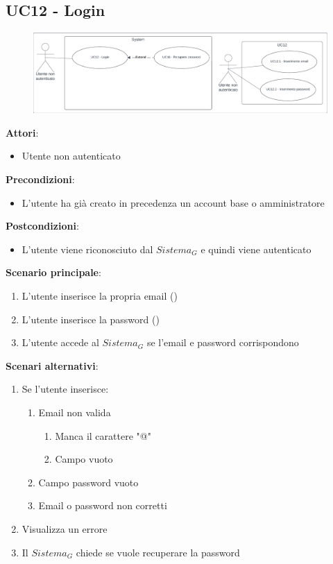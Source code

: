 \subsection{UC12 - Login} \label{usecase:12}
\begin{figure}[H]
    \centering
    \includegraphics[width=0.9\linewidth]{ucd/ucd12.png}
\end{figure}
\textbf{Attori}:
\begin{itemize}
    \item Utente non autenticato
\end{itemize}
\textbf{Precondizioni}:
\begin{itemize}
    \item L'utente ha già creato in precedenza un account base o amministratore
\end{itemize}
\textbf{Postcondizioni}:
\begin{itemize}
    \item L'utente viene riconosciuto dal $\textit{Sistema}_G$ e quindi viene autenticato
\end{itemize}
\textbf{Scenario principale}:
\begin{enumerate}
    \item L'utente inserisce la propria email ()
    \item L'utente inserisce la password ()
    \item L'utente accede al $\textit{Sistema}_G$ se l'email e password corrispondono
\end{enumerate}
\textbf{Scenari alternativi}:
\begin{enumerate}
    \item Se l'utente inserisce:
    \begin{enumerate}
        \item Email non valida
        \begin{enumerate}
            \item Manca il carattere "@"
            \item Campo vuoto
        \end{enumerate}
        \item Campo password vuoto
        \item Email o password non corretti
    \end{enumerate}
    \item Visualizza un errore
    \item Il $\textit{Sistema}_G$ chiede se vuole recuperare la password
\end{enumerate}